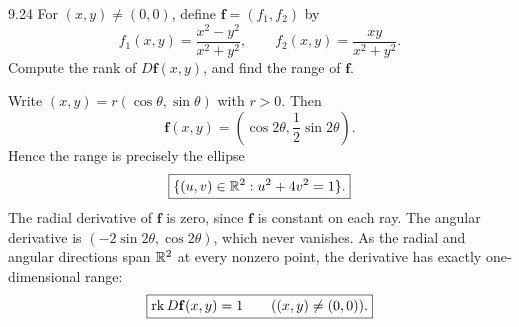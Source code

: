\documentclass[11pt,oneside]{article}
\begin{document}
\begin{exercise}{9.24}
For $(x,y)\ne(0,0)$, define $\mathbf f=(f_1,f_2)$ by
\[
 f_1(x,y)=\frac{x^2-y^2}{x^2+y^2},\qquad
 f_2(x,y)=\frac{xy}{x^2+y^2}.
\]
Compute the rank of $D\mathbf f(x,y)$, and find the range of $\mathbf f$.
\end{exercise}
\begin{solution}
Write $(x,y)=r(\cos\theta,\sin\theta)$ with $r>0$. Then
\[
 \mathbf f(x,y)=\left(\cos2\theta,\frac12\sin2\theta\right).
\]
Hence the range is precisely the ellipse
\[
 \boxed{\{(u,v)\in\mathbb{R}^2:u^2+4v^2=1\}.}
\]
The radial derivative of $\mathbf f$ is zero, since $\mathbf f$ is constant on each ray. The angular derivative is $(-2\sin2\theta,\cos2\theta)$, which never vanishes. As the radial and angular directions span $\mathbb{R}^2$ at every nonzero point, the derivative has exactly one-dimensional range:
\[
 \boxed{\operatorname{rk} D\mathbf f(x,y)=1\qquad((x,y)\ne(0,0)).}
\]
\end{solution}
\end{document}
